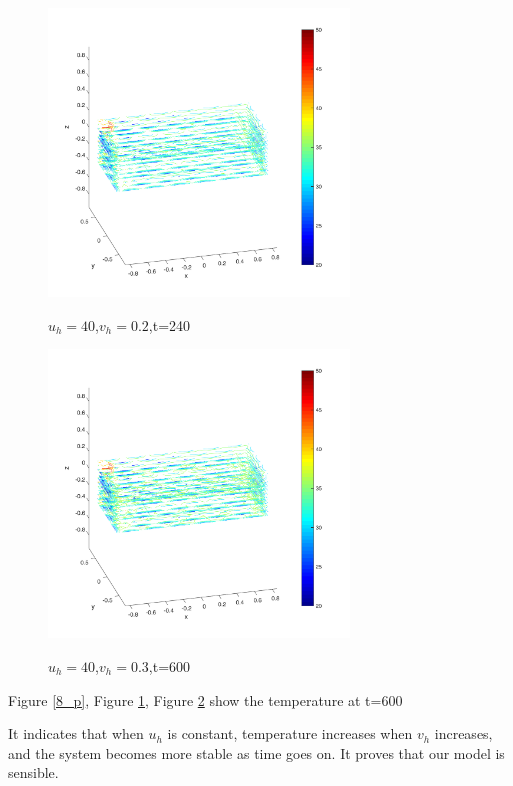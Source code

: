 \documentclass[12pt,a4paper,titlepage]{article}
\begin{document}
\begin{figure}[htb]
  \centering
  \includegraphics[width=8cm]{10-5.pdf}\\
  \caption{$u_h=40$,$v_h=0.2$,t=240}\label{9_p}
\end{figure}

\begin{figure}[htb]
  \centering
  \includegraphics[width=8cm]{11-5.pdf}\\
  \caption{$u_h=40$,$v_h=0.3$,t=600}\label{10_p}
\end{figure}

Figure \ref{8_p}, Figure \ref{9_p}, Figure \ref{10_p} show the temperature at t=600


It indicates that when $u_h$ is constant, temperature increases when $v_h$ increases, and the system becomes more stable as time goes on. It proves that our model is sensible.
\end{document}
